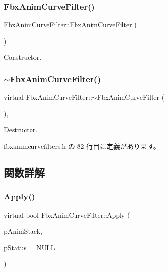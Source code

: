 \subsubsection{\texorpdfstring{Fbx\+Anim\+Curve\+Filter()}{FbxAnimCurveFilter()}}
{\footnotesize\ttfamily Fbx\+Anim\+Curve\+Filter\+::\+Fbx\+Anim\+Curve\+Filter (\begin{DoxyParamCaption}{ }\end{DoxyParamCaption})}



Constructor. 

\mbox{\label{class_fbx_anim_curve_filter_adafe5c10e506cabca6410869f53602bc}} 
\subsubsection{\texorpdfstring{$\sim$\+Fbx\+Anim\+Curve\+Filter()}{~FbxAnimCurveFilter()}}
{\footnotesize\ttfamily virtual Fbx\+Anim\+Curve\+Filter\+::$\sim$\+Fbx\+Anim\+Curve\+Filter (\begin{DoxyParamCaption}{ }\end{DoxyParamCaption})\hspace{0.3cm}{\ttfamily [inline]}, {\ttfamily [virtual]}}



Destructor. 



 fbxanimcurvefilters.\+h の 82 行目に定義があります。



\subsection{関数詳解}
\mbox{\label{class_fbx_anim_curve_filter_aef3900e6180e05661c27ee484ae939c3}} 
\subsubsection{\texorpdfstring{Apply()}{Apply()}\hspace{0.1cm}{\footnotesize\ttfamily [1/5]}}
{\footnotesize\ttfamily virtual bool Fbx\+Anim\+Curve\+Filter\+::\+Apply (\begin{DoxyParamCaption}\item[{\hyperlink{class_fbx_anim_stack}{Fbx\+Anim\+Stack} $\ast$}]{p\+Anim\+Stack,  }\item[{\hyperlink{class_fbx_status}{Fbx\+Status} $\ast$}]{p\+Status = {\ttfamily \hyperlink{fbxarch_8h_a070d2ce7b6bb7e5c05602aa8c308d0c4}{N\+U\+LL}} }\end{DoxyParamCaption})\hspace{0.3cm}{\ttfamily [virtual]}}

